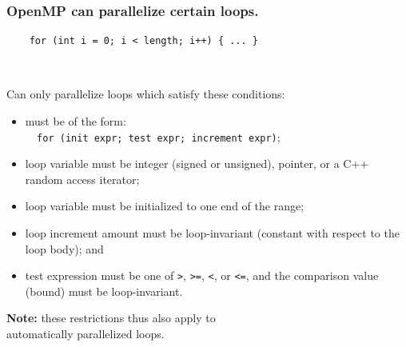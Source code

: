 \begin{frame}[fragile]
  \frametitle{OpenMP can parallelize certain loops.}

  
\begin{verbatim}
    for (int i = 0; i < length; i++) { ... }
\end{verbatim}~\\[1em]

\begin{changemargin}{1cm}
    Can only parallelize loops which satisfy these conditions:
\begin{itemize}
\item must be of the form:\\{\tt ~~for (init expr; test expr; increment expr)};
\item loop variable must be integer (signed or unsigned), pointer, or a C++
random access iterator;
\item loop variable must be initialized to one end of the range;
\item loop increment amount must be loop-invariant (constant with respect to the loop body); and
\item test expression must be one of {\tt >}, {\tt >=}, {\tt <}, or {\tt <=}, and the comparison value (bound) must be loop-invariant.
\end{itemize}

{\bf Note:} these restrictions thus also apply to\\ \qquad \qquad automatically parallelized
loops.
\end{changemargin}

\end{frame}

